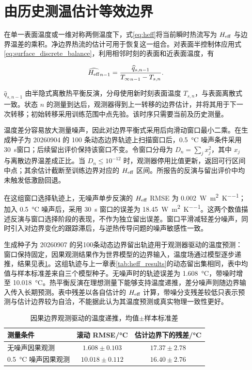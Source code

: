 \section{由历史测温估计等效边界}

在单一表面温度或一维对称两侧温度下，式\eqref{eq:heff}将当前瞬时热流写为 ${H_{\mathrm{eff}}}$ 与边界温差的乘积。净边界热流的估计可用于恢复这一组合。对表面半控制体应用式\eqref{eq:surface_discrete_balance}，利用相邻时刻的表面和近表面温度，有

\begin{equation}
  \widehat{{H_{\mathrm{eff}}}}_{n-1}
  =\frac{\widehat{q}_{s,n-1}}{{T_{\infty}}_{n-1}-T_{s,n}}.
  \label{eq:heff_observer}
\end{equation}

$\widehat q_{s,n-1}$ 由半隐式离散热平衡反演，分母使用新时刻表面温度 $T_{s,n}$，与表面离散式一致。状态 $n$ 的测量到达后，观测器得到上一转移的边界估计，并将其用于下一次转移；初始转移采用训练范围中点先验。该时序只需要当前及历史测量。

温度差分容易放大测量噪声，因此对边界平衡式采用后向滑动窗口最小二乘。在生成种子为 20260904 的 100 条动态边界轨迹上扫描窗口后，\SI{0.5}{\degreeCelsius} 噪声条件采用30~s窗口；后续留出评价保持该窗口不变。令窗口分母为 $D_n=\sum_j x_j^2$，其中 $x_j$ 与离散边界温差成正比。当 $D_n\leq10^{-12}$ 时，观测器停用比值更新，返回可行区间中点；其余估计截断至训练边界对应的 ${H_{\mathrm{eff}}}$ 区间。所报告的反演与留出评价中均未触发低激励回退。

在这组窗口选择轨迹上，无噪声单步反演的 ${H_{\mathrm{eff}}}$ RMSE 为 \SI{0.002}{\watt\per\square\metre\per\kelvin}；加入 \SI{0.5}{\degreeCelsius} 噪声后，采用 30~s 窗口的误差为 \SI{18.45}{\watt\per\square\metre\per\kelvin}。这两个数值描述反演与窗口选择阶段的表现，不作为独立留出误差。窗口平滑减轻差分噪声，同时引入对边界变化的跟踪滞后，与逆热传导问题的噪声敏感性一致\cite{frankel2007loads,chen2019online}。

生成种子为 20260907 的另100条动态边界留出轨迹用于观测器驱动的温度预测：窗口保持固定，因果观测结果作为世界模型的边界输入，温度场通过模型逐步递推，结果见表\ref{tab:causal_heff_observer}。这组轨迹与上一章表\ref{tab:heff_results}的动态留出集相同，表中均值与样本标准差来自三个模型种子。无噪声时的轨迹误差为 \SI{1.608}{\degreeCelsius}，带噪时增至 \SI{10.018}{\degreeCelsius}。热平衡反演在理想测量下能够支持温度递推，差分噪声则随边界输入传入长期预测。表中残差以各自估计的 ${H_{\mathrm{eff}}}$ 计算，带噪分支残差较低只表示预测与估计边界较为自洽，不能据此认为其温度预测或真实物理一致性更好。

\begin{table}[H]
  \centering
  \caption{因果边界观测驱动的温度递推，均值$\pm$样本标准差}
  \label{tab:causal_heff_observer}
  \begin{tabular}{lcc}
    \toprule
    测量条件 & 滚动 RMSE/\si{\degreeCelsius} & 估计边界下的残差/\si{\degreeCelsius} \\
    \midrule
    无噪声因果观测 & $1.608\pm0.103$ & $17.37\pm2.78$ \\
    \SI{0.5}{\degreeCelsius} 噪声因果观测 & $10.018\pm0.112$ & $16.40\pm2.76$ \\
    \bottomrule
  \end{tabular}
\end{table}

